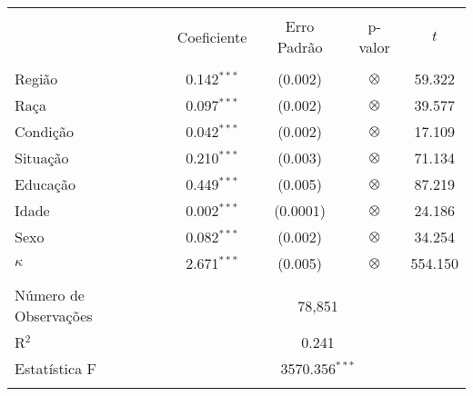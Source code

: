 
\begin{table}[!htbp] \centering 
  \caption{} 
  \label{} 
  \begin{tabular}{@{\extracolsep{5pt}}lcccc} 
  \\[-1.8ex]\hline 
  \hline \\[-1.8ex] 
   & Coeficiente & Erro Padrão & p-valor & \(t\) \\ 
  \hline \\[-1.8ex] 
   Região & 0.142$^{***}$ & (0.002) & \(\otimes\) & 59.322 \\ 
   Raça& 0.097$^{***}$ & (0.002) & \(\otimes\) & 39.577 \\ 
   Condição & 0.042$^{***}$ & (0.002) & \(\otimes\) & 17.109 \\ 
   Situação & 0.210$^{***}$ & (0.003) & \(\otimes\) & 71.134 \\ 
   Educação & 0.449$^{***}$ & (0.005) & \(\otimes\) & 87.219 \\ 
   Idade & 0.002$^{***}$ & (0.0001) & \(\otimes\) & 24.186 \\ 
   Sexo & 0.082$^{***}$ & (0.002) & \(\otimes\) & 34.254 \\ 
   \(\kappa\) & 2.671$^{***}$ & (0.005) & \(\otimes\) & 554.150 \\ 
  \hline \\[-1.8ex] 
  Número de Observações & \multicolumn{4}{c}{78,851} \\ 
  R$^{2}$ & \multicolumn{4}{c}{0.241} \\ 
  Estatística F & \multicolumn{4}{c}{3570.356$^{***}$} \\ 
  \hline 
  \hline \\[-1.8ex] 
  \end{tabular} 
\end{table}


